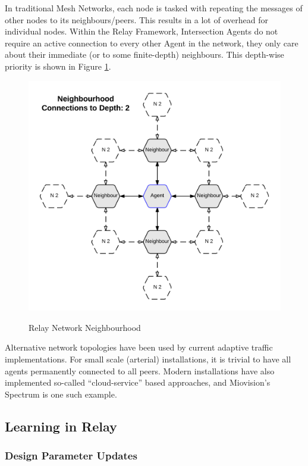\documentclass{report}
\begin{document}
In traditional Mesh Networks, each node is tasked with repeating the messages of other nodes to its neighbours/peers.
This results in a lot of overhead for individual nodes.
Within the Relay Framework, Intersection Agents do not require an active connection to every other Agent in the network, they only care about their immediate (or to some finite-depth) neighbours.
This depth-wise priority is shown in Figure \ref{fig:Relay_Network}.\\

\begin{figure}[!htpb]
	\caption{Relay Network Neighbourhood}
	\includegraphics[width=\textwidth]{figures/Relay_Network.png}
	\label{fig:Relay_Network}
\end{figure}

Alternative network topologies have been used by current adaptive traffic implementations.
For small scale (arterial) installations, it is trivial to have all agents permanently connected to all peers.
Modern installations have also implemented so-called ``cloud-service'' based approaches, and Miovision's Spectrum is one such example.\\

\subsection{Learning in Relay}
\subsubsection{Design Parameter Updates}
\end{document}
